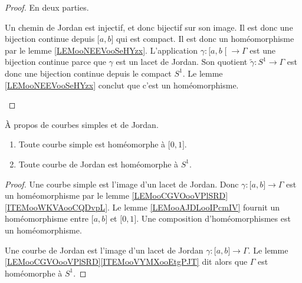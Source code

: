 \begin{proof}
	En deux parties.
	\begin{subproof}
		Un chemin de Jordan est injectif, et donc bijectif sur son image. Il est donc une bijection continue depuis \( \mathopen[ a , b \mathclose]\) qui est compact. Il est donc un homéomorphisme par le lemme \ref{LEMooNEEVooSeHYzx}.
		L'application \( \gamma\colon \mathopen[ a , b \mathclose[\to \Gamma \) est une bijection continue parce que \( \gamma\) est un lacet de Jordan. Son quotient \( \tilde \gamma\colon S^1\to \Gamma\) est donc une bijection continue depuis le compact \( S^1\). Le lemme \ref{LEMooNEEVooSeHYzx} conclut que c'est un homéomorphisme.
	\end{subproof}
\end{proof}

\begin{corollary}		\label{CORooPGFLooUTVZMi}
	À propos de courbes simples et de Jordan.
	\begin{enumerate}
		\item
		      Toute courbe simple est homéomorphe à \( \mathopen[ 0 , 1 \mathclose]\).
		\item		\label{ITEMooIUAXooOfvNov}
		      Toute courbe de Jordan est homéomorphe à \( S^1\).
	\end{enumerate}
\end{corollary}

\begin{proof}
	Une courbe simple est l'image d'un lacet de Jordan. Donc \( \gamma\colon \mathopen[ a , b \mathclose]\to \Gamma\) est un homéomorphisme par le lemme \ref{LEMooCGVOooVPlSRD}\ref{ITEMooWKVAooCQDvpL}. Le lemme \ref{LEMooAJDLooIPcmIV} fournit un homéomorphisme entre \( \mathopen[ a , b \mathclose]\) et \( \mathopen[ 0 , 1 \mathclose]\). Une composition d'homéomorphismes est un homéomorphisme.

	Une courbe de Jordan est l'image d'un lacet de Jordan \( \gamma\colon \mathopen[ a , b \mathclose]\to \Gamma\). Le lemme \ref{LEMooCGVOooVPlSRD}\ref{ITEMooVYMXooEtgPJT} dit alors que \( \Gamma\) est homéomorphe à \( S^1\).
\end{proof}


